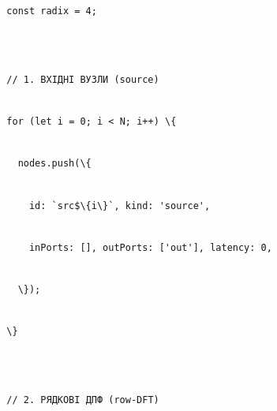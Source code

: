 \documentclass[
]{article}
\newcommand{\passthrough}[1]{#1}
\begin{document}
\passthrough{\lstinline!  !}\passthrough{\lstinline!const!}\passthrough{\lstinline! !}\passthrough{\lstinline!radix!}\passthrough{\lstinline! !}\passthrough{\lstinline!=!}\passthrough{\lstinline! !}\passthrough{\lstinline!4;!}\strut \\
\strut \\
\passthrough{\lstinline!  !}\passthrough{\lstinline!//!}\passthrough{\lstinline! !}\passthrough{\lstinline!1.!}\passthrough{\lstinline! !}\passthrough{\lstinline!ВХІДНІ!}\passthrough{\lstinline! !}\passthrough{\lstinline!ВУЗЛИ!}\passthrough{\lstinline! !}\passthrough{\lstinline!(source)!}\strut \\
\passthrough{\lstinline!  !}\passthrough{\lstinline!for!}\passthrough{\lstinline! !}\passthrough{\lstinline!(let!}\passthrough{\lstinline! !}\passthrough{\lstinline!i!}\passthrough{\lstinline! !}\passthrough{\lstinline!=!}\passthrough{\lstinline! !}\passthrough{\lstinline!0;!}\passthrough{\lstinline! !}\passthrough{\lstinline!i!}\passthrough{\lstinline! !}\passthrough{\lstinline!<!}\passthrough{\lstinline! !}\passthrough{\lstinline!N;!}\passthrough{\lstinline! !}\passthrough{\lstinline!i++)!}\passthrough{\lstinline! !}\passthrough{\lstinline!\{!}\strut \\
\passthrough{\lstinline!    !}\passthrough{\lstinline!nodes.push!}\passthrough{\lstinline!(\{!}\strut \\
\passthrough{\lstinline!      !}\passthrough{\lstinline!id:!}\passthrough{\lstinline! !}\passthrough{\lstinline!`!}\passthrough{\lstinline!src!}\passthrough{\lstinline!$\{i\}`,!}\passthrough{\lstinline! !}\passthrough{\lstinline!kind:!}\passthrough{\lstinline! !}\passthrough{\lstinline!'source',!}\strut \\
\passthrough{\lstinline!      !}\passthrough{\lstinline!inPorts!}\passthrough{\lstinline!:!}\passthrough{\lstinline! !}\passthrough{\lstinline![],!}\passthrough{\lstinline! !}\passthrough{\lstinline!outPorts!}\passthrough{\lstinline!:!}\passthrough{\lstinline! !}\passthrough{\lstinline!['out'],!}\passthrough{\lstinline! !}\passthrough{\lstinline!latency:!}\passthrough{\lstinline! !}\passthrough{\lstinline!0,!}\strut \\
\passthrough{\lstinline!    !}\passthrough{\lstinline!\});!}\strut \\
\passthrough{\lstinline!  !}\passthrough{\lstinline!\}!}\strut \\
\strut \\
\passthrough{\lstinline!  !}\passthrough{\lstinline!//!}\passthrough{\lstinline! !}\passthrough{\lstinline!2.!}\passthrough{\lstinline! !}\passthrough{\lstinline!РЯДКОВІ!}\passthrough{\lstinline! !}\passthrough{\lstinline!ДПФ!}\passthrough{\lstinline! !}\passthrough{\lstinline!(row-DFT)!}\strut \\
\end{document}
